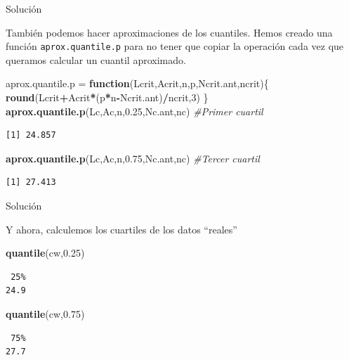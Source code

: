 \documentclass[
  ignorenonframetext,
]{beamer}
\newenvironment{Shaded}{\begin{snugshade}}{\end{snugshade}}
\newcommand{\CommentTok}[1]{\textcolor[rgb]{0.56,0.35,0.01}{\textit{#1}}}
\newcommand{\ControlFlowTok}[1]{\textcolor[rgb]{0.13,0.29,0.53}{\textbf{#1}}}
\newcommand{\DecValTok}[1]{\textcolor[rgb]{0.00,0.00,0.81}{#1}}
\newcommand{\FloatTok}[1]{\textcolor[rgb]{0.00,0.00,0.81}{#1}}
\newcommand{\KeywordTok}[1]{\textcolor[rgb]{0.13,0.29,0.53}{\textbf{#1}}}
\newcommand{\NormalTok}[1]{#1}
\newcommand{\OperatorTok}[1]{\textcolor[rgb]{0.81,0.36,0.00}{\textbf{#1}}}
\newcommand{\StringTok}[1]{\textcolor[rgb]{0.31,0.60,0.02}{#1}}
\begin{document}
\begin{frame}[fragile]{Solución}
\protect\hypertarget{soluciuxf3n-35}{}

También podemos hacer aproximaciones de los cuantiles. Hemos creado una
función \texttt{aprox.quantile.p} para no tener que copiar la operación
cada vez que queramos calcular un cuantil aproximado.

\begin{Shaded}
\begin{Highlighting}[]
\NormalTok{aprox.quantile.p =}\StringTok{ }\ControlFlowTok{function}\NormalTok{(Lcrit,Acrit,n,p,Ncrit.ant,ncrit)\{}
  \KeywordTok{round}\NormalTok{(Lcrit}\OperatorTok{+}\NormalTok{Acrit}\OperatorTok{*}\NormalTok{(p}\OperatorTok{*}\NormalTok{n}\OperatorTok{-}\NormalTok{Ncrit.ant)}\OperatorTok{/}\NormalTok{ncrit,}\DecValTok{3}\NormalTok{)}
\NormalTok{\}}
\KeywordTok{aprox.quantile.p}\NormalTok{(Lc,Ac,n,}\FloatTok{0.25}\NormalTok{,Nc.ant,nc) }\CommentTok{#Primer cuartil}
\end{Highlighting}
\end{Shaded}

\begin{verbatim}
[1] 24.857
\end{verbatim}

\begin{Shaded}
\begin{Highlighting}[]
\KeywordTok{aprox.quantile.p}\NormalTok{(Lc,Ac,n,}\FloatTok{0.75}\NormalTok{,Nc.ant,nc) }\CommentTok{#Tercer cuartil}
\end{Highlighting}
\end{Shaded}

\begin{verbatim}
[1] 27.413
\end{verbatim}

\end{frame}

\begin{frame}[fragile]{Solución}
\protect\hypertarget{soluciuxf3n-36}{}

Y ahora, calculemos los cuartiles de los datos ``reales''

\begin{Shaded}
\begin{Highlighting}[]
\KeywordTok{quantile}\NormalTok{(cw,}\FloatTok{0.25}\NormalTok{)}
\end{Highlighting}
\end{Shaded}

\begin{verbatim}
 25% 
24.9 
\end{verbatim}

\begin{Shaded}
\begin{Highlighting}[]
\KeywordTok{quantile}\NormalTok{(cw,}\FloatTok{0.75}\NormalTok{)}
\end{Highlighting}
\end{Shaded}

\begin{verbatim}
 75% 
27.7 
\end{verbatim}

\end{frame}
\end{document}
